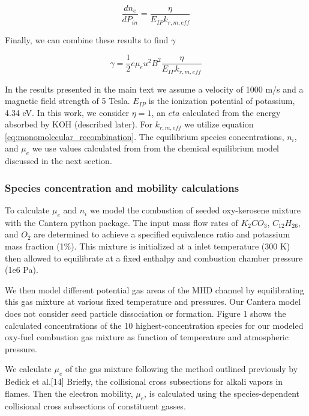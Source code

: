 \begin{equation}
\frac{dn_{e}}{dP_{in}} = \frac{\eta}{E_{IP}k_{r, m, eff}}
\end{equation}

Finally, we can combine these results to find $\gamma$

\begin{equation}
\gamma = \frac{1}{2} e \mu_e u^2 B^2 \frac{\eta}{E_{IP}k_{r, m, eff}}
\end{equation}

In the results presented in the main text we assume a velocity of 1000 m/s and a magnetic field strength of 5 Tesla. $E_{IP}$ is the ionization potential of potassium, 4.34 eV. In this work, we consider $\eta =1$, an $eta$ calculated from the energy absorbed by KOH (described later). For $k_{r, m, eff}$ we utilize equation \ref{eq:monomolecular_recombination}. The equilibrium species concentrations, $n_i$, and $\mu_e$ we use values calculated from from the chemical equilibrium model discussed in the next section. 




\subsubsection{Species concentration and mobility calculations}

To calculate $\mu_e$ and $n_i$ we model the combustion of seeded oxy-kerosene mixture with the Cantera python package. The input mass flow rates of $K_2CO_3$, $C_{12}H_{26}$, and $O_2$ are determined to achieve a specified equivalence ratio and potassium mass fraction (1\%). This mixture is initialized at a inlet temperature (300 K) then allowed to equilibrate at a fixed enthalpy and combustion chamber pressure (1e6 Pa).

We then model different potential gas areas of the MHD channel by equilibrating this gas mixture at various fixed temperature and pressures. Our Cantera model does not consider seed particle dissociation or formation. Figure 1 shows the calculated concentrations of the 10 highest-concentration species for our modeled oxy-fuel combustion gas mixture as function of temperature and atmospheric pressure.

We calculate $\mu_e$ of the gas mixture following the method outlined previously by Bedick et al.{[}14{]} Briefly, the collisional cross subsections for alkali vapors in flames. Then the electron mobility, \(\mu_{e}\), is calculated using the species-dependent collisional cross subsections of constituent gasses.

